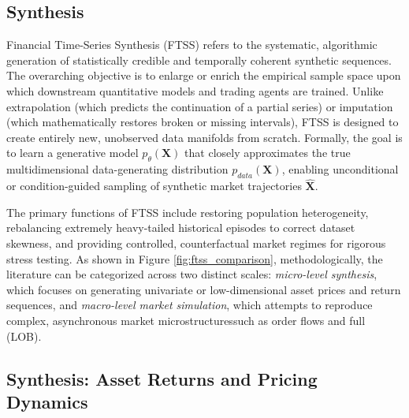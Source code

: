 \subsection{Synthesis}
\label{sec:synthesis}

Financial Time-Series Synthesis (FTSS) refers to the systematic, algorithmic generation of statistically credible and temporally coherent synthetic sequences. The overarching objective is to enlarge or enrich the empirical sample space upon which downstream quantitative models and trading agents are trained. Unlike extrapolation (which predicts the continuation of a partial series) or imputation (which mathematically restores broken or missing intervals), FTSS is designed to create entirely new, unobserved data manifolds from scratch. Formally, the goal is to learn a generative model $p_\theta(\mathbf{X})$ that closely approximates the true multidimensional data-generating distribution $p_{data}(\mathbf{X})$, enabling unconditional or condition-guided sampling of synthetic market trajectories $\hat{\mathbf{X}}$.

The primary functions of FTSS include restoring population heterogeneity, rebalancing extremely heavy-tailed historical episodes to correct dataset skewness, and providing controlled, counterfactual market regimes for rigorous stress testing. As shown in Figure \ref{fig:ftss_comparison}, methodologically, the literature can be categorized across two distinct scales: \textit{micro-level synthesis}, which focuses on generating univariate or low-dimensional asset prices and return sequences, and \textit{macro-level market simulation}, which attempts to reproduce complex, asynchronous market microstructuressuch as order flows and full (LOB).

\subsection{Synthesis: Asset Returns and Pricing Dynamics}

